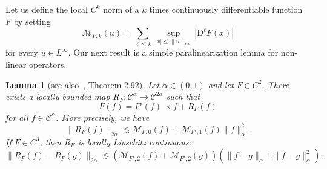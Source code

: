 \documentclass[11pt,a4paper]{article}
\newcommand{\mathD}{\mathrm{D}}
\newtheorem{lemma}[theorem]{Lemma}
\theoremstyle{remark}
\newcommand{\CC}{\ensuremath{\mathscr{C}}}
\begin{document}
Let us define the local $C^{k}$ norm of a $k$ times continuously
differentiable function $F$ by setting
\[
   \mathcal{M}_{F,k} ( u ) = \sum_{\ell \leqslant k} \sup_{| x | \leqslant \| u \|_{L^{\infty}}} | \mathD^{\ell} F ( x ) |
\]
for every $u \in L^{\infty}$. Our next result is a simple paralinearization lemma for non-linear operators.

\begin{lemma}[see also~\cite{Bahouri2011}, Theorem 2.92]\label{lemma:paralinearization}
  Let $\alpha \in ( 0,1 )$ and let $F \in C^{2}$. There exists a locally bounded map $R_{F} \colon  \CC^{\alpha} \rightarrow \CC^{2 \alpha}$ such that
  \begin{equation}\label{eq:para-linearization}
    F ( f ) =F' ( f ) \prec f+R_{F} ( f )
  \end{equation}
  for all $f \in \CC^{\alpha}$. More precisely, we have
  \[
     \| R_{F} ( f ) \|_{2 \alpha} \lesssim \mathcal{M}_{F,0} ( f ) +\mathcal{M}_{F' ,1} ( f ) \| f \|_{\alpha}^{2}.
  \]
  If $F \in C^{3}$, then $R_{F}$ is locally Lipschitz continuous:
  \[
     \| R_{F} ( f ) -R_{F} ( g ) \|_{2 \alpha} \lesssim ( \mathcal{M}_{F' ,2}( f ) +\mathcal{M}_{F' ,2} ( g ) ) ( \| f-g \|_{\alpha} + \| f-g \|_{\alpha}^{2} ).
  \]
\end{lemma}
\end{document}
